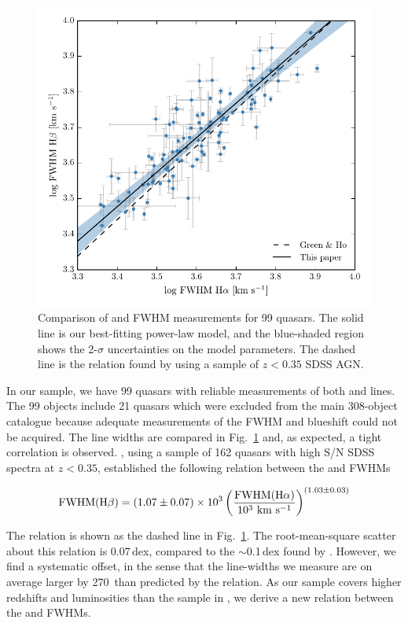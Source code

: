 \begin{figure}
    \includegraphics[width=\columnwidth]{figures/chapter03/ha_hb_width_comparison.pdf} 
    \caption{Comparison of \ha and \hb FWHM measurements for 99 quasars. The solid line is our best-fitting power-law model, and the blue-shaded region shows the 2-$\sigma$ uncertainties on the model parameters. The dashed line is the relation found by \citet{greene05} using a sample of $z<0.35$ SDSS AGN.} 
    \label{fig:hahbcomp}
\end{figure}

In our sample, we have 99 quasars with reliable measurements of both \ha and \hb lines. 
The 99 objects include 21 quasars which were excluded from the main 308-object catalogue because adequate measurements of the  FWHM and blueshift could not be acquired. 
The line widths are compared in Fig.~\ref{fig:hahbcomp} and, as expected, a tight correlation is observed.  
\citet{greene05}, using a sample of 162 quasars with high S/N SDSS spectra at $z < 0.35$, established the following relation between the \ha and \hb FWHMs

\begin{equation}
  \rm{FWHM}(\rm{H}\beta) = \left( 1.07 \pm 0.07 \right) \times 10^3 \left( \frac{ \rm{FWHM}(\rm{H}\alpha) }{10^3 ~\rm{km}~\rm{s}^{-1} } \right)^{(1.03 \pm 0.03)}
\end{equation}

The relation is shown as the dashed line in Fig.~\ref{fig:hahbcomp}.
The root-mean-square scatter about this relation is 0.07\,dex, compared to the $\sim$0.1\,dex found by \citet{greene05}. 
However, we find a systematic offset, in the sense that the \hb line-widths we measure are on average larger by 270\kms\, than predicted by the \citet{greene05} relation. 
As our sample covers higher redshifts and luminosities than the sample in \citet{greene05}, we derive a new relation between the \ha and \hb FWHMs.       

